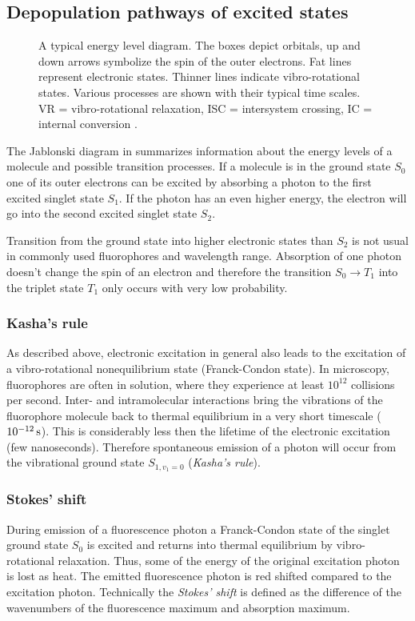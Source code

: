 \subsection{Depopulation pathways of excited states}
\begin{figure}[!hbt]
  \centering
  \def\svgscale{.8}
  {\small
}
  \caption{A typical energy level diagram. The boxes depict orbitals,
    up and down arrows symbolize the spin of the outer electrons. Fat
    lines represent electronic states. Thinner lines indicate
    vibro-rotational states. Various processes are shown with their
    typical time scales. VR = vibro-rotational relaxation, ISC =
    intersystem crossing, IC = internal conversion \cite[inspired
    from][]{Haken2006}.}
  \label{fig:flu-level}
\end{figure}
The Jablonski diagram in  summarizes information    
about the energy levels of a molecule and possible transition
processes. If a molecule is in the ground state $S_0$ one of its outer
electrons can be excited by absorbing a photon to the first excited
singlet state $S_1$.  If the photon has an even higher energy, the
electron will go into the second excited singlet state $S_2$.

Transition from the ground state into higher electronic states than
$S_2$ is not usual in commonly used fluorophores and wavelength range.
Absorption of one photon doesn't change the spin of an electron and
therefore the transition $S_0\rightarrow T_1$ into the triplet state
$T_1$ only occurs with very low probability.

\subsubsection{Kasha's rule}
As described above, electronic excitation in general also leads to the   
excitation of a vibro-rotational nonequilibrium state (Franck-Condon
state). In microscopy, fluorophores are often in solution, where they
experience at least $10^{12}$ collisions per second. Inter- and
intramolecular interactions bring the vibrations of the fluorophore
molecule back to thermal equilibrium in a
very short timescale ($\unit[10^{-12}]{s}$). This is considerably less
then the lifetime of the electronic excitation (few
nanoseconds). Therefore spontaneous emission of a photon will occur
from the vibrational ground state $S_{1,v_1=0}$ (\emph{Kasha's rule}).

\subsubsection{Stokes' shift}
During emission of a fluorescence photon a Franck-Condon state of the  
singlet ground state $S_0$ is excited and returns into thermal
equilibrium by vibro-rotational relaxation. Thus, some of the energy
of the original excitation photon is lost as heat. The emitted
fluorescence photon is red shifted compared to the excitation
photon. Technically the \emph{Stokes' shift} is defined as the
difference of the wavenumbers of the fluorescence maximum and
absorption maximum.


